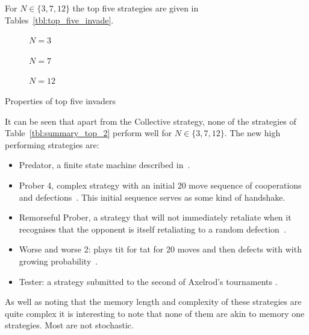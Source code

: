 \documentclass{article}
\begin{document}
For \(N\in\{3, 7, 12\}\) the top five strategies are given in
Tables~\ref{tbl:top_five_invade}.

\begin{table}[!hbtp]
    \begin{subfigure}[t]{\textwidth}
        \centering
        
        \caption{\(N=3\)}
    \end{subfigure}
    \begin{subfigure}[t]{\textwidth}
        \centering
        
        \caption{\(N=7\)}
    \end{subfigure}
    \begin{subfigure}[t]{\textwidth}
        \centering
        
        \caption{\(N=12\)}
    \end{subfigure}
    \caption{Properties of top five invaders}
    \label{tbl:top_five_invade}
\end{table}

It can be seen that apart from the Collective strategy, none of the strategies
of Table~\ref{tbl:summary_top_2} perform well for \(N\in\{3, 7, 12\}\). The new
high performing strategies are:

\begin{itemize}
    \item Predator, a finite state machine described in~\cite{Ashlock2006}.
    \item Prober 4, complex strategy with an initial 20 move sequence of
        cooperations and defections~\cite{prison}. This initial sequence serves
        as some kind of handshake.
    \item Remorseful Prober, a strategy that will not immediately retaliate when
        it recognises that the opponent is itself retaliating to a random
        defection~\cite{Li2011}.
    \item  Worse and worse 2: plays tit for tat for 20 moves and then defects
        with with growing probability~\cite{prison}.
    \item Tester: a strategy submitted to the second of Axelrod's tournaments
        \cite{Axelrod1980b}.
\end{itemize}

As well as noting that the memory length and complexity of these strategies are
quite complex it is interesting to note that none of them are akin to memory one
strategies. Most are not stochastic.
\end{document}
